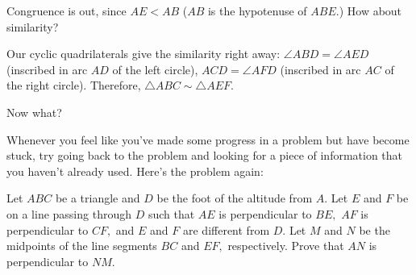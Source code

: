 






Congruence is out, since $AE < AB$ ($AB$ is the hypotenuse of $ABE.$)  How about similarity?







Our cyclic quadrilaterals give the similarity right away: $\angle ABD = \angle AED$ (inscribed in arc $AD$ of the left circle), $ACD = \angle AFD$ (inscribed in arc $AC$ of the right circle). Therefore, $\triangle ABC \sim \triangle AEF.$

Now what?

Whenever you feel like you've made some progress in a problem but have become stuck, try going back to the problem and looking for a piece of information that you haven't already used. Here's the problem again:

Let $ABC$ be a triangle and $D$ be the foot of the altitude from $A.$  Let $E$ and $F$ be on a line passing through $D$ such that $AE$ is perpendicular to $BE,$ $AF$ is perpendicular to $CF,$ and $E$ and $F$ are different from $D.$ Let $M$ and $N$ be the midpoints of the line segments $BC$ and $EF,$ respectively. Prove that $AN$ is perpendicular to $NM.$

